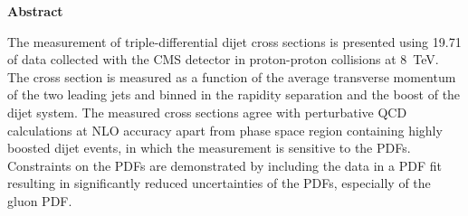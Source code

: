 \thispagestyle{plain}
\begin{center}
    \LARGE{\textbf{Abstract}}\\[2em]
\end{center}
    \normalsize
    The measurement of triple-differential dijet cross sections is presented
    using \SI{19.71}{\fbinv} of data collected with the CMS detector in
    proton-proton collisions at \SI{8}{\TeV}. The cross section is measured as a
    function of the average transverse momentum of the two leading jets and
    binned in the rapidity separation and the boost of the dijet system. The
    measured cross sections agree with perturbative QCD calculations at NLO
    accuracy apart from phase space region containing highly boosted dijet
    events, in which the measurement is sensitive to the PDFs. Constraints
    on the PDFs are demonstrated by including the data in a PDF fit resulting in
    significantly reduced uncertainties of the PDFs, especially of the gluon PDF.
    \vspace{1ex}


\cleardoublepage

